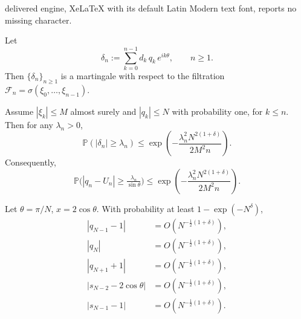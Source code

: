 \documentclass[10pt,a4paper]{amsart}
\begin{document}
delivered engine, XeLaTeX with its default Latin Modern text font, reports no missing character.
\begin{lemma}\label{lem:martingale}
Let
\[
\delta_n:=\sum_{k=0}^{n-1} d_k\,q_k\,e^{ik\theta}, \qquad n\ge1.
\]
Then $\{\delta_n\}_{n\ge1}$ is a martingale with respect to the filtration
$\mathcal{F}_n=\sigma(\xi_0,\dots,\xi_{n-1})$.
\end{lemma}

\begin{lemma}\label{lem:applyAzuma}
Assume $|\xi_k|\le M$ almost surely and $|q_k|\le N$ with probability one, for $k\le n$.  
Then for any $\lambda_n>0$,
\[
\mathbb{P}(|\delta_n|\ge\lambda_n)
\le
\exp\!\left(-\frac{\lambda_n^2 N^{2(1+\delta)}}{2M^2 n}\right).
\]
Consequently,
\[
\mathbb{P}\bigl(|q_n-U_n|\ge \tfrac{\lambda_n}{\sin\theta}\bigr)
\le
\exp\!\left(-\frac{\lambda_n^2 N^{2(1+\delta)}}{2M^2 n}\right).
\]
\end{lemma}

\begin{prop}\label{prop:randombigO}
Let $\theta=\pi/N$, $x=2\cos\theta$.  
With probability at least $1-\exp(-N^\delta)$,
\begin{align*}
|q_{N-1}-1| &= O\!\left(N^{-\frac12(1+\delta)}\right),\\
|q_{N}| &= O\!\left(N^{-\frac12(1+\delta)}\right),\\
|q_{N+1}+1| &= O\!\left(N^{-\frac12(1+\delta)}\right),\\
|s_{N-2}-2\cos\theta| &= O\!\left(N^{-\frac12(1+\delta)}\right),\\
|s_{N-1}-1| &= O\!\left(N^{-\frac12(1+\delta)}\right).
\end{align*}
\end{prop}
\end{document}
